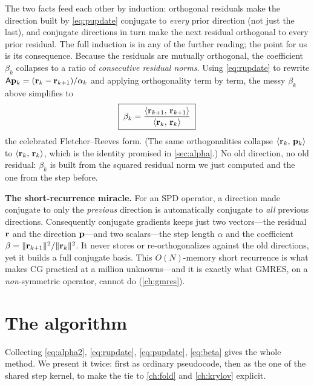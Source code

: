 The two facts feed each other by induction: orthogonal residuals make the
direction built by \eqref{eq:pupdate} conjugate to \emph{every} prior direction
(not just the last), and conjugate directions in turn make the next residual
orthogonal to every prior residual. The full induction is in any of the further
reading; the point for us is its consequence. Because the residuals are mutually
orthogonal, the coefficient $\beta_k$ collapses to a ratio of \emph{consecutive
residual norms}. Using \eqref{eq:rupdate} to rewrite
$\mathsf{A}\mathbf{p}_k=(\mathbf{r}_k-\mathbf{r}_{k+1})/\alpha_k$ and applying orthogonality term by term,
the messy $\beta_k$ above simplifies to
\begin{equation}
\label{eq:beta}
  \boxed{\;\beta_k = \frac{\left\langle \mathbf{r}_{k+1},\, \mathbf{r}_{k+1}\right\rangle}{\left\langle \mathbf{r}_k,\, \mathbf{r}_k\right\rangle}\;}
\end{equation}
the celebrated Fletcher--Reeves form. (The same orthogonalities collapse
$\left\langle \mathbf{r}_k,\, \mathbf{p}_k\right\rangle$ to $\left\langle \mathbf{r}_k,\, \mathbf{r}_k\right\rangle$, which is the identity promised
in \cref{sec:alpha}.) No old direction, no old residual: $\beta_k$ is built from
the squared residual norm we just computed and the one from the step before.

\begin{keyidea}
\textbf{The short-recurrence miracle.} For an SPD operator, a direction made
conjugate to only the \emph{previous} direction is automatically conjugate to
\emph{all} previous directions. Consequently conjugate gradients keeps just two
vectors---the residual $\mathbf{r}$ and the direction $\mathbf{p}$---and two scalars---the step
length $\alpha$ and the coefficient $\beta=\lVert\mathbf{r}_{k+1}\rVert^2/\lVert\mathbf{r}_k\rVert^2$. It
never stores or re-orthogonalizes against the old directions, yet it builds a
full conjugate basis. This $O(N)$-memory short recurrence is what makes CG
practical at a million unknowns---and it is exactly what GMRES, on a
\emph{non}-symmetric operator, cannot do (\cref{ch:gmres}).
\end{keyidea}

\section{The algorithm}
\label{sec:algorithm}

Collecting \eqref{eq:alpha2}, \eqref{eq:rupdate}, \eqref{eq:pupdate},
\eqref{eq:beta} gives the whole method. We present it twice: first as ordinary
pseudocode, then as the one  of the shared step kernel, to
make the tie to \cref{ch:fold} and \cref{ch:krylov} explicit.

